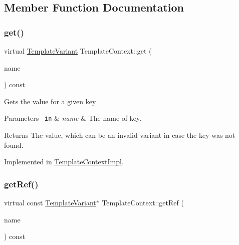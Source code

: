 \subsection{Member Function Documentation}
\mbox{\label{class_template_context_a6d65a9047de8ec4363612e576031e781}} 
\subsubsection{\texorpdfstring{get()}{get()}}
{\footnotesize\ttfamily virtual \mbox{\hyperlink{class_template_variant}{Template\+Variant}} Template\+Context\+::get (\begin{DoxyParamCaption}\item[{const \mbox{\hyperlink{class_q_c_string}{Q\+C\+String}} \&}]{name }\end{DoxyParamCaption}) const\hspace{0.3cm}{\ttfamily [pure virtual]}}

Gets the value for a given key 
\begin{DoxyParams}[1]{Parameters}
\mbox{\texttt{ in}}  & {\em name} & The name of key. \\
\hline
\end{DoxyParams}
\begin{DoxyReturn}{Returns}
The value, which can be an invalid variant in case the key was not found. 
\end{DoxyReturn}


Implemented in \mbox{\hyperlink{class_template_context_impl_a0609e62251b223bbd14851738fa10727}{Template\+Context\+Impl}}.

\mbox{\label{class_template_context_ac73a3e85149ff072aea9e3ab091c4ed1}} 
\subsubsection{\texorpdfstring{getRef()}{getRef()}}
{\footnotesize\ttfamily virtual const \mbox{\hyperlink{class_template_variant}{Template\+Variant}}$\ast$ Template\+Context\+::get\+Ref (\begin{DoxyParamCaption}\item[{const \mbox{\hyperlink{class_q_c_string}{Q\+C\+String}} \&}]{name }\end{DoxyParamCaption}) const\hspace{0.3cm}{\ttfamily [pure virtual]}}

